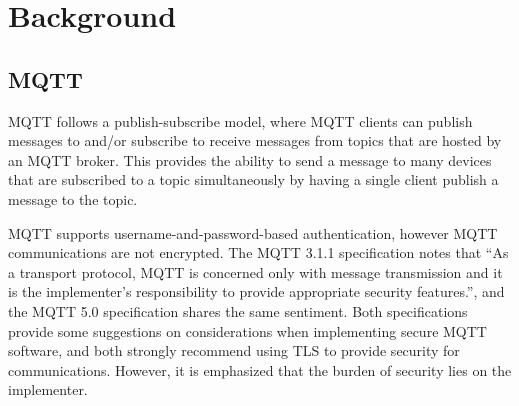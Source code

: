 \documentclass[12pt]{article}
\begin{document}
\section{Background}
\subsection{MQTT}
MQTT follows a publish-subscribe model, where MQTT clients can publish messages to and/or subscribe to receive messages from topics that are hosted by an MQTT broker. This provides the ability to send a message to many devices that are subscribed to a topic simultaneously by having a single client publish a message to the topic. \par
MQTT supports username-and-password-based authentication, however MQTT communications are not encrypted. The MQTT 3.1.1 specification notes that ``As a transport protocol, MQTT is concerned only with message transmission and it is the implementer’s responsibility to provide appropriate security features.''\cite{mqtt3.1.1}, and the MQTT 5.0 specification shares the same sentiment\cite{mqtt5.0}. Both specifications provide some suggestions on considerations when implementing secure MQTT software, and both strongly recommend using TLS to provide security for communications. However, it is emphasized that the burden of security lies on the implementer. 
\end{document}

